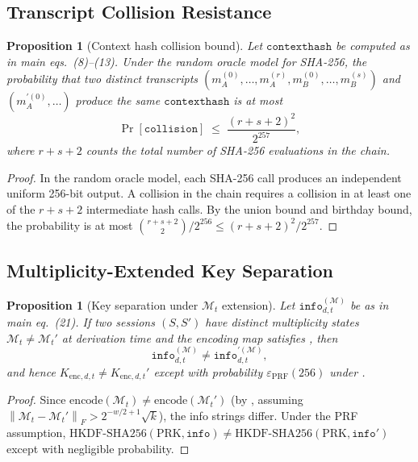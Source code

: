 \documentclass[12pt,letterpaper]{article}
\theoremstyle{plain}
\newtheorem{proposition}[theorem]{Proposition}
\theoremstyle{definition}
\newcommand{\M}{\mathcal{M}}
\newcommand{\frnorm}[1]{\left\|#1\right\|_{F}}
\newcommand{\HKDF}{\mathrm{HKDF\text{-}SHA256}}
\newcommand{\eps}{\varepsilon}
\begin{document}
\subsection{Transcript Collision Resistance}

\begin{proposition}[Context hash collision bound]
\label{prop:contexthash}
Let \(\mathtt{contexthash}\) be computed as in main eqs.~(8)--(13).
Under the random oracle model for SHA-256, the probability that two
distinct transcripts \((m_A^{(0)},\ldots,m_A^{(r)}, m_B^{(0)},\ldots,
m_B^{(s)})\) and \((m_A^{\prime(0)},\ldots)\) produce the same
\(\mathtt{contexthash}\) is at most
\[
  \Pr[\mathtt{collision}] \;\leq\;
  \frac{(r+s+2)^2}{2^{257}},
\]
where \(r+s+2\) counts the total number of SHA-256 evaluations in the
chain.
\end{proposition}
\begin{proof}
In the random oracle model, each SHA-256 call produces an independent
uniform 256-bit output.  A collision in the chain requires a collision
in at least one of the \(r+s+2\) intermediate hash calls.  By the
union bound and birthday bound, the probability is at most
\(\binom{r+s+2}{2}/2^{256} \leq (r+s+2)^2/2^{257}\).
\end{proof}

\subsection{Multiplicity-Extended Key Separation}

\begin{proposition}[Key separation under \(\M_t\) extension]
\label{prop:key_separation}
Let \(\mathtt{info}_{d,t}^{(\M)}\) be as in main eq.~(21).
If two sessions \((S, S')\) have distinct multiplicity states
\(\M_t \neq \M_t'\) at derivation time and the encoding map satisfies
, then
\[
  \mathtt{info}_{d,t}^{(\M)} \neq \mathtt{info}_{d,t}^{\prime(\M)},
\]
and hence \(K_{\mathrm{enc},d,t} \neq K_{\mathrm{enc},d,t}'\) except
with probability \(\eps_{\mathrm{PRF}}(256)\) under .
\end{proposition}
\begin{proof}
Since \(\mathrm{encode}(\M_t) \neq \mathrm{encode}(\M_t')\) (by
, assuming
\(\frnorm{\M_t - \M_t'} > 2^{-w/2+1}\sqrt{k}\)),
the info strings differ.  Under the PRF assumption,
\(\HKDF(\mathrm{PRK}, \mathtt{info}) \neq \HKDF(\mathrm{PRK}, \mathtt{info}')\)
except with negligible probability.
\end{proof}
\end{document}
